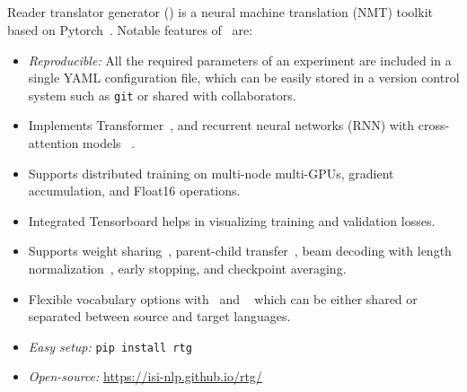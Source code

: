 \subsection{\rtg}
\label{sec:rtg}
Reader translator generator (\rtg) is a neural machine translation (NMT) toolkit based on Pytorch~\cite{NEURIPS2019_Pytorch}. 
Notable features of \rtg\ are:
\begin{itemize}[noitemsep,topsep=0pt,leftmargin=4mm]
\item \textit{Reproducible:} All the required parameters of an experiment are included in a single YAML configuration file, which can be easily stored in a version control system such as \texttt{git} or shared with collaborators.
\item Implements Transformer~\cite{vaswani-2017-attention}, and recurrent neural networks (RNN) with cross-attention models ~\cite{bahdanau2014nmtattn,luong2015effectiveAttn}.
\item Supports distributed training on multi-node multi-GPUs, gradient accumulation, and Float16 operations.
\item Integrated Tensorboard helps in visualizing training and validation losses. 
\item Supports weight sharing~\cite{press-wolf-2017-embeddings}, parent-child transfer~\cite{zoph-etal-2016-transfer}, beam decoding with length normalization~\cite{wu-etal-2016-GNMT}, early stopping, and checkpoint averaging. 
\item Flexible vocabulary options with \nlcodec\ and \sentpiece~\cite{kudo-richardson-2018-sentencepiece} which can be either shared or separated between source and target languages.
\item \textit{Easy setup:} \texttt{pip install rtg}
\item \textit{Open-source:} \url{https://isi-nlp.github.io/rtg/}
\end{itemize}

